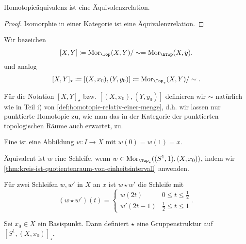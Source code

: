 \begin{lemma}\label{lm:homotopieäquivalenz-ist-äquivalenzrelation}
Homotopieäquivalenz ist eine Äquivalenzrelation.    
\end{lemma}

\begin{proof}
    Isomorphie in einer Kategorie ist eine Äquivalenzrelation.
\end{proof}


\begin{notation}
    Wir bezeichen
    \[
        [X,Y] \coloneqq  \Mor_{\Top}(X,Y) / \sim = \Mor_{\hTop}(X,y)
    .\] 
    und analog
    \[
        [X,Y]_{\star} \coloneqq  [(X,x_0),(Y,y_0)] \coloneqq  \Mor_{\Top_{\star}}(X,Y) / \sim 
    .\] 
\end{notation}

\begin{remark*}
    Für die Notation $[X,Y]_{\star}$ bzw. $[(X,x_0),(Y,y_0)]$ definieren wir $\sim $ natürlich wie in Teil i) von \autoref{def:homotopie-relativ-einer-menge}, d.h. wir lassen nur punktierte Homotopie zu, wie man das in der Kategorie der punktierten topologischen Räume auch erwartet, zu.
\end{remark*}

\begin{definition}[Schleife]\label{def:schleife}
    Eine  ist eine Abbildung $w\colon  I \to  X$ mit $w(0) = w(1) = x$. 

    Äquivalent ist  $w$ eine Schleife, wenn  $w\in \Mor_{\Top_{\star}}((S^1,1), (X,x_0))$, indem wir \autoref{thm:kreis-ist-quotientenraum-von-einheitsintervall} anwenden.
\end{definition}


\begin{definition}\label{def:komposition-von-schleifen}
    Für zwei Schleifen $w,w'$ in  $X$ an  $x$ ist  $w \star w'$ die Schleife mit
     \[
         (w \star w')(t) = \begin{cases}
             w(2t) & 0\leq t\leq \frac{1}{2} \\
             w'(2t-1) & \frac{1}{2}\leq t\leq 1
         \end{cases}
    .\] 
\end{definition}

\begin{theorem}\label{thm:star-ist-gruppenstruktur}
    Sei $x_0\in X$ ein Basispunkt. Dann definiert $\star$ eine Gruppenstruktur auf  $[S^1,(X,x_0)]_{\star}$.
\end{theorem}

